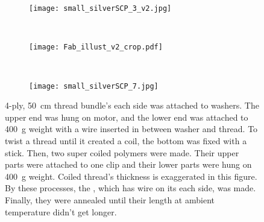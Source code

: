\begin{figure}[b]
	\centering
	\begin{subfigure}{.22\linewidth}
		\centering\texttt{[image: small\_silverSCP\_3\_v2.jpg]}
		\caption{\label{silverSCP_2}}
	\end{subfigure}
	~
	\begin{subfigure}{.57\linewidth}
		\centering\texttt{[image: Fab\_illust\_v2\_crop.pdf]}
		\caption{\label{silverSCP_illust}}
	\end{subfigure}
	~
	\begin{subfigure}{.15\linewidth}
		\centering\texttt{[image: small\_silverSCP\_7.jpg]}
		\caption{\label{silverSCP_annealing}}
	\end{subfigure}
	\caption[Process of making \scps with silver-painted nylon thread]{ 4-ply, \SI{50}{\centi\meter} thread bundle's each side was attached to washers. The upper end was hung on motor, and the lower end was attached to \SI{400}{\gram} weight with a wire inserted in between washer and thread.  To twist a thread until it created a coil, the bottom was fixed with a stick. Then, two super coiled polymers were made. Their upper parts were attached to one clip and their lower parts were hung on \SI{400}{\gram} weight. Coiled thread's thickness is exaggerated in this figure.  By these processes, the \scpnospace, which has wire on its each side, was made. Finally, they were annealed until their length at ambient temperature didn't get longer.}
	\label{silverSCP_makingof}
\end{figure}



